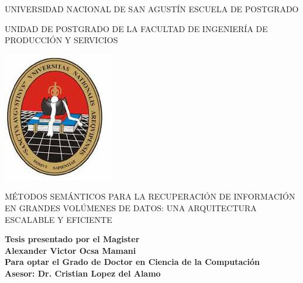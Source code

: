 \begin{titlepage}
\pagestyle{empty}


\begin{center}

\fontsize{20pt}{20pt} \selectfont UNIVERSIDAD NACIONAL DE SAN AGUSTÍN 
ESCUELA DE POSTGRADO

\vspace*{1cm}
\begin{center}
{\Large UNIDAD DE POSTGRADO DE LA FACULTAD DE INGENIERÍA 
DE PRODUCCIÓN Y SERVICIOS}
\end{center}
\vspace*{1cm}


\begin{center}
      
    
      \includegraphics[scale=0.7]{imagenes/unsaescudo.jpg}\\ 
\end{center}
      

\vspace*{1cm}
\begin{center}
{\Large MÉTODOS SEMÁNTICOS PARA LA RECUPERACIÓN DE INFORMACIÓN EN GRANDES VOLÚMENES DE DATOS: UNA ARQUITECTURA ESCALABLE Y EFICIENTE }



\end{center}

\vspace*{1.5cm}

\begin{flushright}

\small \textbf{Tesis presentado por el Magister\\
Alexander Victor Ocsa Mamani\\
Para optar el Grado de Doctor en Ciencia de la Computación\\
Asesor: Dr. Cristian Lopez del Alamo}


\end{flushright}
\end{center}
\end{titlepage}
